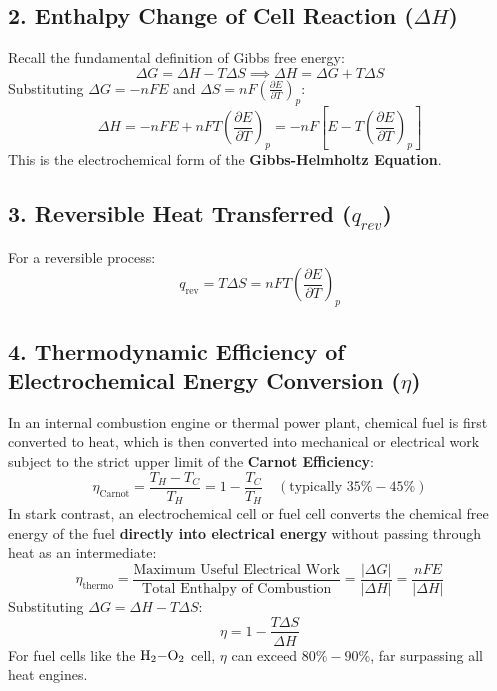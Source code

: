 \subsection{2. Enthalpy Change of Cell Reaction ($\Delta H$)}
Recall the fundamental definition of Gibbs free energy:
\begin{equation}
    \Delta G = \Delta H - T \Delta S \implies \Delta H = \Delta G + T \Delta S
\end{equation}
Substituting $\Delta G = -nFE$ and $\Delta S = nF \left(\frac{\partial E}{\partial T}\right)_p$:
\begin{equation}
    \boxed{\Delta H = -n F E + n F T \left(\frac{\partial E}{\partial T}\right)_p = -n F \left[ E - T \left(\frac{\partial E}{\partial T}\right)_p \right]}
\end{equation}
This is the electrochemical form of the \textbf{Gibbs-Helmholtz Equation}.

\subsection{3. Reversible Heat Transferred ($q_{rev}$)}
For a reversible process:
\begin{equation}
    \boxed{q_{\text{rev}} = T \Delta S = n F T \left(\frac{\partial E}{\partial T}\right)_p}
\end{equation}

\subsection{4. Thermodynamic Efficiency of Electrochemical Energy Conversion ($\eta$)}
In an internal combustion engine or thermal power plant, chemical fuel is first converted to heat, which is then converted into mechanical or electrical work subject to the strict upper limit of the \textbf{Carnot Efficiency}:
\begin{equation}
    \eta_{\text{Carnot}} = \frac{T_H - T_C}{T_H} = 1 - \frac{T_C}{T_H} \quad (\text{typically } 35\%-45\%)
\end{equation}
In stark contrast, an electrochemical cell or fuel cell converts the chemical free energy of the fuel \textbf{directly into electrical energy} without passing through heat as an intermediate:
\begin{equation}
    \boxed{\eta_{\text{thermo}} = \frac{\text{Maximum Useful Electrical Work}}{\text{Total Enthalpy of Combustion}} = \frac{|\Delta G|}{|\Delta H|} = \frac{nFE}{|\Delta H|}}
\end{equation}
Substituting $\Delta G = \Delta H - T\Delta S$:
\begin{equation}
    \boxed{\eta = 1 - \frac{T\Delta S}{\Delta H}}
\end{equation}
For fuel cells like the $\ce{H2-O2}$ cell, $\eta$ can exceed $80\%-90\%$, far surpassing all heat engines.

